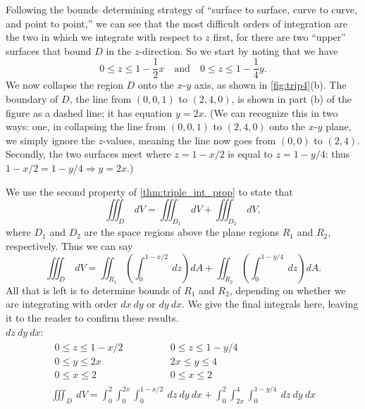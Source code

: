 {Following the bounds--determining strategy of ``surface to surface, curve to curve, and point to point,''  we can see that the most difficult orders of integration are the two in which we integrate with respect to $z$ first, for there are two ``upper'' surfaces that bound $D$ in the $z$-direction. So we start by noting that we have 
$$0\leq z\leq 1-\frac12x \quad\text{and}\quad 0\leq z\leq 1-\frac14y.$$
We now collapse the region $D$ onto the $x$-$y$ axis, as shown in \autoref{fig:trip4}(b). The boundary of $D$, the line from $(0,0,1)$ to $(2,4,0)$, is shown in part (b) of the figure as a dashed line; it has equation $y=2x$. (We can recognize this in two ways: one, in collapsing the line from $(0,0,1)$ to $(2,4,0)$ onto the $x$-$y$ plane, we simply ignore the $z$-values, meaning the line now goes from $(0,0)$ to $(2,4)$. Secondly, the two surfaces meet where $z=1-x/2$ is equal to $z=1-y/4$: thus $1-x/2=1-y/4 \Rightarrow y=2x.$)

We use the second property of \autoref{thm:triple_int_prop} to state that 
$$\iiint_D \ dV = \iiint_{D_1}\ dV + \iiint_{D_2}\ dV,$$
where $D_1$ and $D_2$ are the space regions above the plane regions $R_1$ and $R_2$, respectively. Thus we can say
$$\iiint_D\ dV = \iint_{R_1}\left(\int_0^{1-x/2}\ dz\right)dA + \iint_{R_2}\left(\int_0^{1-y/4}\ dz\right)dA.$$
All that is left is to determine bounds of $R_1$ and $R_2$, depending on whether we are integrating with order $dx\ dy$ or $dy\ dx$. We give the final integrals here, leaving it to the reader to confirm these results.\\

\noindent $dz\ dy\ dx$:\\[-2\baselineskip]
\begin{gather*}
 \begin{gathered}
  0\leq z\leq 1-x/2\\
  0\leq y\leq 2x\\
  0\leq x\leq 2
 \end{gathered}
 \qquad\qquad
 \begin{gathered}
  0\leq z\leq 1-y/4\\
  2x\leq y\leq 4\\
  0\leq x\leq 2
 \end{gathered} \\
 \iiint_D\ dV = \int_0^2\int_0^{2x}\int_0^{1-x/2}\ dz\ dy\ dx +\int_0^2\int_{2x}^4\int_0^{1-y/4}\ dz\ dy\ dx
\end{gather*}

}
